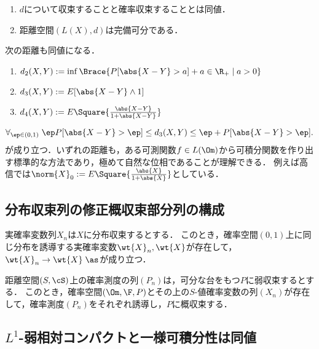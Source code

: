 \documentclass[uplatex,dvipdfmx]{jsreport}
\begin{document}
\begin{proposition}\mbox{}
    \begin{enumerate}
        \item $d$について収束することと確率収束することとは同値．
        \item 距離空間$(L(X),d)$は完備可分である．
    \end{enumerate}
\end{proposition}
\begin{remarks}
    次の距離も同値になる．
    \begin{enumerate}
        \item $d_2(X,Y):=\inf\Brace{P[\abs{X-Y}>a]+a\in\R_+\mid a>0}$
        \item $d_3(X,Y):=E[\abs{X-Y}\land 1]$
        \item $d_4(X,Y):=E\Square{\frac{\abs{X-Y}}{1+\abs{X-Y}}}$
    \end{enumerate}
    \[\forall_{\ep\in(0,1)}\;\ep P[\abs{X-Y}>\ep]\le d_3(X,Y)\le\ep+P[\abs{X-Y}>\ep].\]
    が成り立つ．いずれの距離も，ある可測関数$f\in L(\Om)$から可積分関数を作り出す標準的な方法であり，極めて自然な位相であることが理解できる．
    例えば高信\cite{高信}では$\norm{X}_0:=E\Square{\frac{\abs{X}}{1+\abs{X}}}$としている．
\end{remarks}

\subsection{分布収束列の修正概収束部分列の構成}

\begin{theorem}[Skorohodの概収束実現定理]
    実確率変数列$X_n$は$X$に分布収束するとする．
    このとき，確率空間$(0,1)$上に同じ分布を誘導する実確率変数$\wt{X}_n,\wt{X}$が存在して，
    $\wt{X}_n\to\wt{X}\;\as$が成り立つ．
\end{theorem}

\begin{theorem}[一般の距離空間の場合]
    距離空間$(S,\cS)$上の確率測度の列$(P_n)$は，可分な台をもつ$P$に弱収束するとする．
    このとき，確率空間$(\Om,\F,P)$とその上の$S$-値確率変数の列$(X_n)$が存在して，確率測度$(P_n)$をそれぞれ誘導し，$P$に概収束する．
\end{theorem}

\subsection{$L^1$-弱相対コンパクトと一様可積分性は同値}
\end{document}
